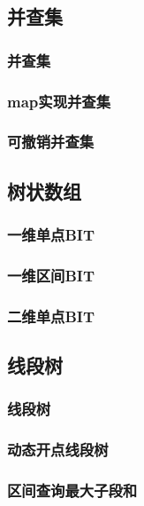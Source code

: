 \documentclass[a4paper,twocolumn]{article}
\begin{document}
\subsection{并查集}
\subsubsection{并查集}

\subsubsection{map实现并查集}

\subsubsection{可撤销并查集}

\subsection{树状数组}
\subsubsection{一维单点BIT}

\subsubsection{一维区间BIT}

\subsubsection{二维单点BIT}

\subsection{线段树}
\subsubsection{线段树}

\subsubsection{动态开点线段树}

\subsubsection{区间查询最大子段和}

\end{document}

